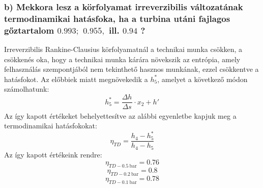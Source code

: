 \subsubsection*{b) Mekkora lesz a körfolyamat irreverzibilis változatának termodinamikai hatásfoka, ha a turbina utáni fajlagos gőztartalom $0.993;$ $0.955,$ ill. $0.94$ ?}
\noindent Irreverzibilis Rankine-Clausius körfolyamatnál a technikai munka csökken, a csökkenés oka, hogy a technikai munka kárára növekszik az entrópia, amely felhasználás szempontjából nem tekinthető hasznos munkának, ezzel csökkentve a hatásfokot. Az előbbiek miatt megnövekedik a $h_{5}^{*}$, amelyet a következő módon számolhatunk:
\begin{equation*}
h_{5}^{*}= \dfrac{\Delta h_{}}{\Delta s_{}} \cdot x_{2} + h'_{}
\end{equation*}
\noindent Az így kapott értékeket behelyettesítve az alábbi egyenletbe kapjuk meg a termodinamikai hatásfokokat:
\begin{equation*}
\eta_{TD}= \dfrac{h_{4}-h_{5}^{*}}{h_{4}-h_{5}}
\end{equation*}
\noindent Az így kapott értékeink rendre:
\begin{equation*}
\eta_{TD-\SI{0.5}{\bar}}= 0.76
\end{equation*}
\begin{equation*}
\eta_{TD-\SI{0.2}{\bar}}= 0.8
\end{equation*}
\begin{equation*}
\eta_{TD-\SI{0.1}{\bar}}= 0.78
\end{equation*}

\pagebreak